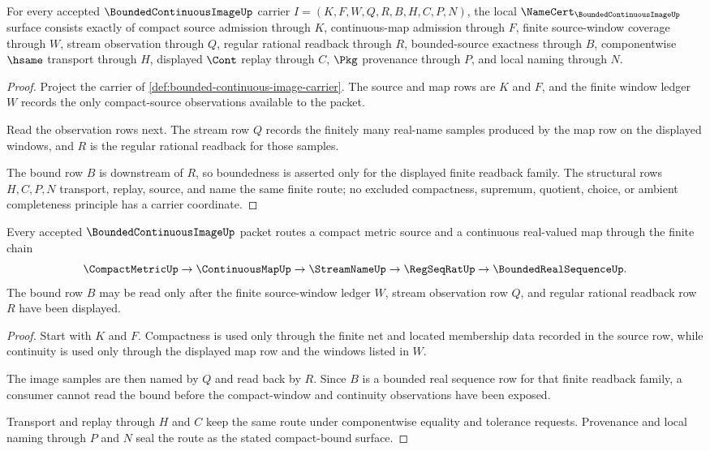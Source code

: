 \begin{theorem}
\label{thm:bounded-continuous-image-namecert-obligations}
For every accepted $\BoundedContinuousImageUp$ carrier $I=(K,F,W,Q,R,B,H,C,P,N)$, the local $\NameCert_{\BoundedContinuousImageUp}$ surface consists exactly of compact source admission through $K$, continuous-map admission through $F$, finite source-window coverage through $W$, stream observation through $Q$, regular rational readback through $R$, bounded-source exactness through $B$, componentwise $\hsame$ transport through $H$, displayed $\Cont$ replay through $C$, $\Pkg$ provenance through $P$, and local naming through $N$.
\end{theorem}
\begin{proof}
Project the carrier of \autoref{def:bounded-continuous-image-carrier}. The source and map rows are $K$ and $F$, and the finite window ledger $W$ records the only compact-source observations available to the packet.

Read the observation rows next. The stream row $Q$ records the finitely many real-name samples produced by the map row on the displayed windows, and $R$ is the regular rational readback for those samples.

The bound row $B$ is downstream of $R$, so boundedness is asserted only for the displayed finite readback family. The structural rows $H,C,P,N$ transport, replay, source, and name the same finite route; no excluded compactness, supremum, quotient, choice, or ambient completeness principle has a carrier coordinate.
\end{proof}

\begin{theorem}
\label{thm:bounded-continuous-image-compact-bound-route}
Every accepted $\BoundedContinuousImageUp$ packet routes a compact metric source and a continuous real-valued map through the finite chain
$$
\CompactMetricUp \to \ContinuousMapUp \to \StreamNameUp \to \RegSeqRatUp \to \BoundedRealSequenceUp .
$$
The bound row $B$ may be read only after the finite source-window ledger $W$, stream observation row $Q$, and regular rational readback row $R$ have been displayed.
\end{theorem}
\begin{proof}
Start with $K$ and $F$. Compactness is used only through the finite net and located membership data recorded in the source row, while continuity is used only through the displayed map row and the windows listed in $W$.

The image samples are then named by $Q$ and read back by $R$. Since $B$ is a bounded real sequence row for that finite readback family, a consumer cannot read the bound before the compact-window and continuity observations have been exposed.

Transport and replay through $H$ and $C$ keep the same route under componentwise equality and tolerance requests. Provenance and local naming through $P$ and $N$ seal the route as the stated compact-bound surface.
\end{proof}

